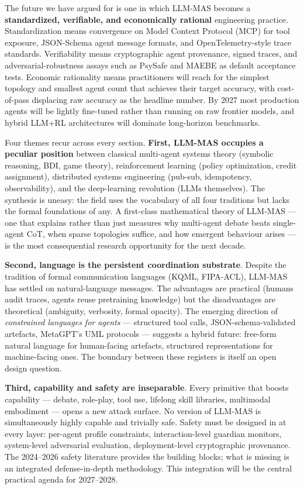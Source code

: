 The future we have argued for is one in which LLM-MAS becomes a \textbf{standardized, verifiable, and economically rational} engineering practice. Standardization means convergence on Model Context Protocol (MCP) for tool exposure, JSON-Schema agent message formats, and OpenTelemetry-style trace standards. Verifiability means cryptographic agent provenance, signed traces, and adversarial-robustness assays such as PsySafe and MAEBE as default acceptance tests. Economic rationality means practitioners will reach for the simplest topology and smallest agent count that achieves their target accuracy, with cost-of-pass displacing raw accuracy as the headline number. By 2027 most production agents will be lightly fine-tuned rather than running on raw frontier models, and hybrid LLM+RL architectures will dominate long-horizon benchmarks.

Four themes recur across every section. \textbf{First, LLM-MAS occupies a peculiar position} between classical multi-agent systems theory (symbolic reasoning, BDI, game theory), reinforcement learning (policy optimization, credit assignment), distributed systems engineering (pub-sub, idempotency, observability), and the deep-learning revolution (LLMs themselves). The synthesis is uneasy: the field uses the vocabulary of all four traditions but lacks the formal foundations of any. A first-class mathematical theory of LLM-MAS --- one that explains rather than just measures why multi-agent debate beats single-agent CoT, when sparse topologies suffice, and how emergent behaviour arises --- is the most consequential research opportunity for the next decade.

\textbf{Second, language is the persistent coordination substrate}. Despite the tradition of formal communication languages (KQML, FIPA-ACL), LLM-MAS has settled on natural-language messages. The advantages are practical (humans audit traces, agents reuse pretraining knowledge) but the disadvantages are theoretical (ambiguity, verbosity, formal opacity). The emerging direction of \emph{constrained languages for agents} --- structured tool calls, JSON-schema-validated artefacts, MetaGPT's UML protocols --- suggests a hybrid future: free-form natural language for human-facing artefacts, structured representations for machine-facing ones. The boundary between these registers is itself an open design question.

\textbf{Third, capability and safety are inseparable}. Every primitive that boosts capability --- debate, role-play, tool use, lifelong skill libraries, multimodal embodiment --- opens a new attack surface. No version of LLM-MAS is simultaneously highly capable and trivially safe. Safety must be designed in at every layer: per-agent profile constraints, interaction-level guardian monitors, system-level adversarial evaluation, deployment-level cryptographic provenance. The 2024--2026 safety literature provides the building blocks; what is missing is an integrated defense-in-depth methodology. This integration will be the central practical agenda for 2027--2028.


